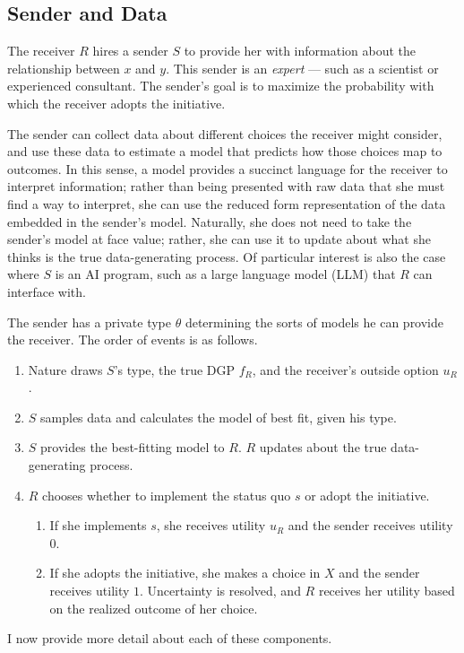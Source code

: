 \documentclass[11pt,dvipsnames]{article}
\begin{document}
\subsection{Sender and Data}
The receiver $R$ hires a sender $S$ to provide her with information about the relationship between $x$ and $y$.
This sender is an \emph{expert} --- such as a scientist or experienced consultant.
The sender's goal is to maximize the probability with which the receiver adopts the initiative.

The sender can collect data about different choices the receiver might consider, and use these data to estimate a model that predicts how those choices map to outcomes.
In this sense, a model provides a succinct language for the receiver to interpret information; rather than being presented with raw data that she must find a way to interpret, she can use the reduced form representation of the data embedded in the sender's model.
Naturally, she does not need to take the sender's model at face value; rather, she can use it to update about what she thinks is the true data-generating process.
Of particular interest is also the case where $S$ is an AI program, such as a large language model (LLM) that $R$ can interface with.


The sender has a private type $\theta$ determining the sorts of models he can provide the receiver.
The order of events is as follows.
\begin{enumerate}
\item Nature draws $S$'s type, the true DGP $f_R$, and the receiver's outside option $u_R$.
\item $S$ samples data and calculates the model of best fit, given his type.
\item $S$ provides the best-fitting model to $R$. $R$ updates about the true data-generating process.
\item $R$ chooses whether to implement the status quo $s$ or adopt the initiative.
\begin{enumerate}
\item If she implements $s$, she receives utility $u_R$ and the sender receives utility $0$.
\item If she adopts the initiative, she makes a choice in $X$ and the sender receives utility $1$. Uncertainty is resolved, and $R$ receives her utility based on the realized outcome of her choice.
\end{enumerate}
\end{enumerate}
I now provide more detail about each of these components.
\end{document}

